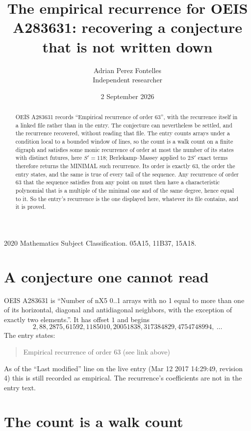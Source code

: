 \documentclass[11pt,a4paper]{article}
\title{The empirical recurrence for OEIS A283631: recovering a conjecture that is not written down}
\author{Adrian Perez Fontelles\\ \small Independent researcher}
\date{2 September 2026}
\theoremstyle{plain}
\theoremstyle{definition}
\begin{document}
\maketitle

\begin{abstract}
OEIS A283631 records ``Empirical recurrence of order $63$'', with the recurrence itself in a
linked file rather than in the entry. The conjecture can nevertheless be settled, and the
recurrence recovered, without reading that file. The entry counts arrays under a condition
local to a bounded window of lines, so the count is a walk count on a finite digraph and
satisfies some monic recurrence of order at most the number of its states with distinct
futures, here $S'=118$; Berlekamp--Massey applied to $2S'$ exact
terms therefore returns the MINIMAL such recurrence. Its order is exactly $63$, the order
the entry states, and the same is true of every tail of the sequence. Any recurrence of order
$63$ that the sequence satisfies from any point on must then have a characteristic
polynomial that is a multiple of the minimal one and of the same degree, hence equal to it. So
the entry's recurrence is the one displayed here, whatever its file contains, and it is
proved.
\end{abstract}

\noindent\small 2020 Mathematics Subject Classification. 05A15, 11B37, 15A18.\normalsize

\section{A conjecture one cannot read}

OEIS A283631 is ``Number of nX5 0..1 arrays with no 1 equal to more than one of its horizontal, diagonal and antidiagonal neighbors, with the exception of exactly two elements.''. It has offset $1$ and begins
\[
2, 88, 2875, 61592, 1185010, 20051838, 317384829, 4754748994,\ \dots
\]
The entry states:
\begin{quote}
Empirical recurrence of order 63 (see link above)
\end{quote}
As of the ``Last modified'' line on the live entry (Mar 12 2017 14:29:49, revision 4) this is still
recorded as empirical. The recurrence's coefficients are not in the entry text.

\section{The count is a walk count}
\end{document}
